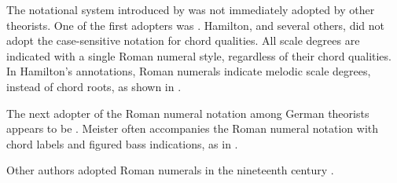 

The notational system introduced by
\textcite{weber1817versuch} was not immediately adopted by
other theorists. One of the first adopters was
\textcite{hamilton1840catechism}. Hamilton, and several
others, did not adopt the case-sensitive notation for chord
qualities. All scale degrees are indicated with a single
Roman numeral style, regardless of their chord qualities. In
Hamilton's annotations, Roman numerals indicate melodic
scale degrees, instead of chord roots, as shown in
.


The next adopter of the Roman numeral notation among German
theorists appears to be \textcite{meister1852vollstandige}.
Meister often accompanies the Roman numeral notation with
chord labels and figured bass indications, as in
.


Other authors adopted Roman numerals in the nineteenth
century \parencite{sechter1853grundsatze,
richter1860lehrbuch, tiersch1874elementarbuch,
tracy1878theory}.